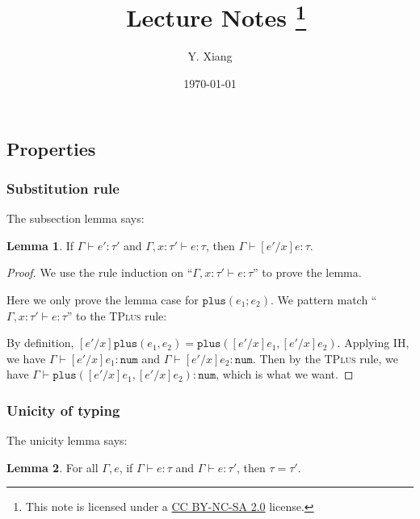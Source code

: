 \documentclass{article}
\title{\vspace{-3em}\course\, Lecture Notes \asnum\footnote{This note is licensed under a \href{https://creativecommons.org/licenses/by-nc-sa/2.0/}{CC BY-NC-SA 2.0} license.}\quad}
\author{Y. Xiang\vspace{1em}}
\date{\today\vspace{-1em}}
\theoremstyle{definition}
\newtheorem{lemma}{Lemma}[section]
\begin{document}
\maketitle

\subsection{Properties}

\subsubsection*{Substitution rule}

The subsection lemma says:
\begin{lemma}
    \label{lem:substitution}
    If $\Gamma \vdash e':\tau'$ and $\Gamma, x:\tau'\vdash e:\tau$, then $\Gamma \vdash [e'/x]e:\tau$.
\end{lemma}

\begin{proof}
    We use the rule induction on ``$\Gamma, x:\tau'\vdash e:\tau$'' to prove the lemma.

    Here we only prove the lemma case for $\mathtt{plus}(e_1;e_2)$.
    We pattern match ``$\Gamma, x:\tau'\vdash e:\tau$'' to the \textsc{TPlus} rule:
    \begin{mathpar}
    \end{mathpar}

    By definition, $[e'/x]\mathtt{plus}(e_1,e_2) = \mathtt{plus}([e'/x]e_1, [e'/x]e_2)$. Applying IH, we have $\Gamma \vdash [e'/x]e_1:\mathtt{num}$ and $\Gamma \vdash [e'/x]e_2:\mathtt{num}$. Then by the \textsc{TPlus} rule, we have $\Gamma \vdash \mathtt{plus}([e'/x]e_1, [e'/x]e_2):\mathtt{num}$, which is what we want.
\end{proof}

\subsubsection*{Unicity of typing}

The unicity lemma says:
\begin{lemma}
    For all $\Gamma, e$, if $\Gamma \vdash e: \tau$ and $\Gamma \vdash e: \tau'$, then $\tau = \tau'$.
\end{lemma}
\end{document}
